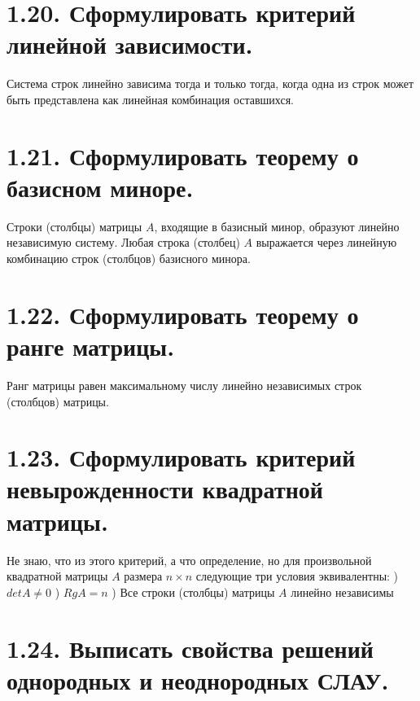 \documentclass{article}
\begin{document}
\section*{\LARGE 1.20. Сформулировать критерий линейной зависимости.  }

Система строк линейно зависима тогда и только тогда, когда одна из строк может быть представлена как линейная комбинация оставшихся.

\section*{\LARGE 1.21. Сформулировать теорему о базисном миноре.  }

Строки (столбцы) матрицы $A$, входящие в базисный минор, образуют линейно независимую систему. Любая строка (столбец) $A$ выражается через линейную комбинацию строк (столбцов) базисного минора.

\section*{\LARGE 1.22. Сформулировать теорему о ранге матрицы.  }

Ранг матрицы равен максимальному числу линейно независимых строк (столбцов) матрицы.

\section*{\LARGE 1.23. Сформулировать критерий невырожденности квадратной матрицы. }

Не знаю, что из этого критерий, а что определение, но для произвольной квадратной матрицы $A$ размера $n \times n$ следующие три условия эквивалентны:
) $detA \ne 0$
) $RgA = n$
) Все строки (столбцы) матрицы $A$ линейно независимы

\section*{\LARGE 1.24. Выписать свойства решений однородных и неоднородных СЛАУ.  }
\end{document}
